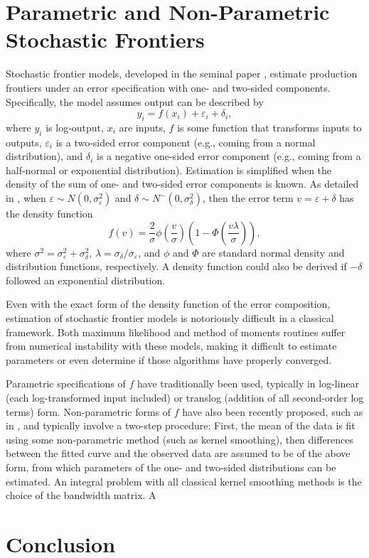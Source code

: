 \documentclass[twocolumn]{article}
\newcommand{\ep}{\varepsilon}
\begin{document}
\section{Parametric and Non-Parametric Stochastic Frontiers}

\label{sec:SF}

Stochastic frontier models, developed in the seminal paper \cite{AignerLovellSchmidt}, estimate production frontiers under an error specification with one- and two-sided components. Specifically, the model assumes output can be described by
\begin{equation}
	y_i = f(x_i) + \ep_i + \delta_i,
\end{equation}
where $y_i$ is log-output, $x_i$ are inputs, $f$ is some function that transforms inputs to outputs, $\ep_i$ is a two-sided error component (e.g., coming from a normal distribution), and $\delta_i$ is a negative one-sided error component (e.g., coming from a half-normal or exponential distribution). Estimation is simplified when the density of the sum of one- and two-sided error components is known. As detailed in \cite{AignerLovellSchmidt}, when $\ep\sim N(0, \sigma_\ep^2)$ and $\delta\sim N^-(0, \sigma_\delta^2)$, then the error term $v = \ep + \delta$ has the density function
\begin{equation}
	f(v) = \frac2\sigma \phi\left(\frac{v}\sigma\right)\left(1 - \Phi\left(\frac{v\lambda}{\sigma}\right)\right),
\end{equation}
where $\sigma^2 = \sigma_\ep^2 + \sigma_\delta^2$, $\lambda = \sigma_\delta / \sigma_\ep$, and $\phi$ and $\Phi$ are standard normal density and distribution functions, respectively. A density function could also be derived if $-\delta$ followed an exponential distribution.

Even with the exact form of the density function of the error composition, estimation of stochastic frontier models is notoriously difficult in a classical framework. Both maximum likelihood and method of moments routines suffer from numerical instability with these models, making it difficult to estimate parameters or even determine if those algorithms have properly converged. 

Parametric specifications of $f$ have traditionally been used, typically in log-linear (each log-transformed input included) or translog (addition of all second-order log terms) form. Non-parametric forms of $f$ have also been recently proposed, such as in \cite{ParmeterRacine}, and typically involve a two-step procedure: First, the mean of the data is fit using some non-parametric method (such as kernel smoothing), then differences between the fitted curve and the observed data are assumed to be of the above form, from which parameters of the one- and two-sided distributions can be estimated. An integral problem with all classical kernel smoothing methods is the choice of the bandwidth matrix. A 

\section{Conclusion}



\end{document}

